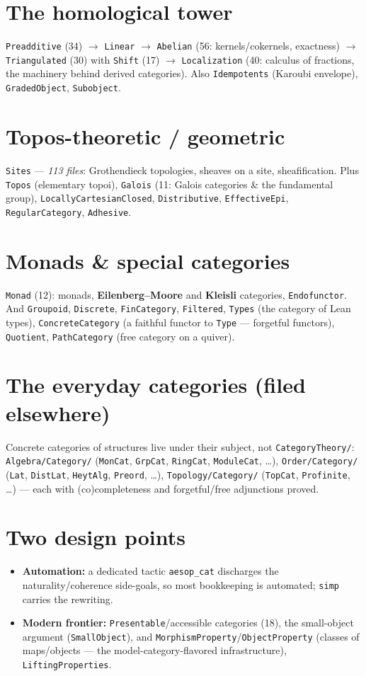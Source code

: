 \documentclass[11pt]{article}
\newcommand{\code}[1]{\texttt{#1}}
\begin{document}
\section*{The homological tower}
\code{Preadditive} (34) $\to$ \code{Linear} $\to$ \code{Abelian} (56:
kernels/cokernels, exactness) $\to$ \code{Triangulated} (30) with \code{Shift}
(17) $\to$ \code{Localization} (40: calculus of fractions, the machinery behind
derived categories). Also \code{Idempotents} (Karoubi envelope),
\code{GradedObject}, \code{Subobject}.

\section*{Topos-theoretic / geometric}
\code{Sites} --- \emph{113 files}: Grothendieck topologies, sheaves on a site,
sheafification. Plus \code{Topos} (elementary topoi), \code{Galois} (11: Galois
categories \& the fundamental group), \code{LocallyCartesianClosed},
\code{Distributive}, \code{EffectiveEpi}, \code{RegularCategory}, \code{Adhesive}.

\section*{Monads \& special categories}
\code{Monad} (12): monads, \textbf{Eilenberg--Moore} and \textbf{Kleisli}
categories, \code{Endofunctor}. And \code{Groupoid}, \code{Discrete},
\code{FinCategory}, \code{Filtered}, \code{Types} (the category of Lean types),
\code{ConcreteCategory} (a faithful functor to \code{Type} --- forgetful
functors), \code{Quotient}, \code{PathCategory} (free category on a quiver).

\section*{The everyday categories (filed elsewhere)}
Concrete categories of structures live under their subject, not
\code{CategoryTheory/}: \code{Algebra/Category/} (\code{MonCat}, \code{GrpCat},
\code{RingCat}, \code{ModuleCat}, \dots), \code{Order/Category/} (\code{Lat},
\code{DistLat}, \code{HeytAlg}, \code{Preord}, \dots), \code{Topology/Category/}
(\code{TopCat}, \code{Profinite}, \dots) --- each with (co)completeness and
forgetful/free adjunctions proved.

\section*{Two design points}
\begin{itemize}
  \item \textbf{Automation:} a dedicated tactic \code{aesop\_cat} discharges the
    naturality/coherence side-goals, so most bookkeeping is automated;
    \code{simp} carries the rewriting.
  \item \textbf{Modern frontier:} \code{Presentable}/accessible categories (18),
    the small-object argument (\code{SmallObject}), and
    \code{MorphismProperty}/\code{ObjectProperty} (classes of maps/objects --- the
    model-category-flavored infrastructure), \code{LiftingProperties}.
\end{itemize}
\end{document}
